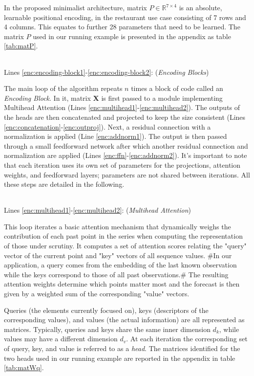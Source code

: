 \documentclass[algorithms,article,submit,pdftex,moreauthors]{Definitions/mdpi}
\begin{document}
In the proposed minimalist architecture, matrix $P \in \mathbb{R}^{7 \times 4}$ is an absolute, learnable positional encoding, in the restaurant use case consisting of 7 rows and 4 columns. This equates to further 28 parameters that need to be learned. The matrix $P$ used in our running example is presented in the appendix as table \ref{tab:matP}. 

~\\Lines \ref{enc:encoding-block1}-\ref{enc:encoding-block2}: (\textit{Encoding Blocks})

The main loop of the algorithm repeats $n$ times a block of code called an {\it Encoding Block}. In it, matrix {\bf X} is first passed to a module implementing Multihead Attention (Lines \ref{enc:multihead1}-\ref{enc:multihead2}). The outputs of the heads are then concatenated and projected to keep the size consistent (Lines \ref{enc:concatenation}-\ref{enc:outproj}). Next, a residual connection with a normalization is applied (Line \ref{enc:addnorm1}). The output is then passed through a small feedforward network after which another residual connection and normalization are applied (Lines \ref{enc:ffn}-\ref{enc:addnorm2}).
It's important to note that each iteration uses its own set of parameters for the projections, attention weights, and feedforward layers; parameters are not shared between iterations.
All these steps are detailed in the following.

~\\Lines \ref{enc:multihead1}-\ref{enc:multihead2}: (\textit{Multihead Attention})

This loop iterates a basic attention mechanism that dynamically weighs the contribution of each past point in the series when computing the representation of those under scrutiny. It computes a set of attention scores relating the "query" vector of the current point and "key" vectors of all sequence values. \#In our application, a query comes from the embedding of the last known observation while the keys correspond to those of all past observations.\# The resulting attention weights determine which points matter most and the forecast is then given by a weighted sum of the corresponding "value" vectors.

Queries (the elements currently focused on), keys (descriptors of the corresponding values), and values (the actual information) are all represented as matrices. Typically, queries and keys share the same inner dimension $d_k$, while values may have a different dimension $d_v$. At each iteration the corresponding set of query, key, and value is referred to as a \textit{head}. The matrices identified for the two heads used in our running example are reported in the appendix in table \ref{tab:matWq}.
\end{document}

